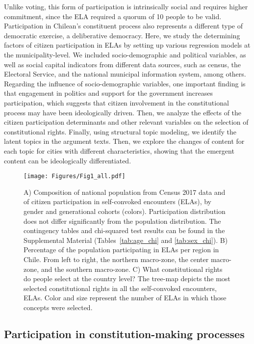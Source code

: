 \documentclass[onecolumn]{article}
\begin{document}
Unlike voting, this form of participation is intrinsically social and requires higher commitment, since the ELA required a quorum of 10 people to be valid. Participation in Chilean's constituent process also represents a different type of democratic exercise, a deliberative democracy. Here, we study the determining factors of citizen participation in ELAs by setting up various regression models at the municipality-level. We included socio-demographic and political variables, as well as social capital indicators from different data sources, such as census, the Electoral Service, and the national municipal information system, among others. Regarding the influence of socio-demographic variables, one important finding is that engagement in politics and support for the government increases participation, which suggests that citizen involvement in the constitutional process may have been ideologically driven. Then, we analyze the effects of the citizen participation determinants and other relevant variables on the selection of constitutional rights. Finally, using structural topic modeling, we identify the latent topics in the argument texts. Then, we explore the changes of content for each topic for cities with different characteristics, showing that the emergent content can be ideologically differentiated. 

\begin{figure}[!t]
\centering
\texttt{[image: Figures/Fig1\_all.pdf]}
\caption{A) Composition of national population from Census 2017 data and of citizen participation in self-convoked encounters (ELAs), by gender and generational cohorts (colors). Participation distribution does not differ significantly from the population distribution. The contingency tables and chi-squared test results can be found in the Supplemental Material (Tables~\ref{tab:age_chi} and \ref{tab:sex_chi}). B) Percentage of the population participating in ELAs per region in Chile. From left to right, the northern macro-zone, the center macro-zone, and the southern macro-zone.  C) What constitutional rights do people select at the country level? The tree-map depicts the most selected constitutional rights in all the self-convoked encounters, ELAs. Color and size represent the number of ELAs in which those concepts were selected.}
\label{fig:edad}
\end{figure}

\subsection*{Participation in constitution-making processes}
\end{document}
